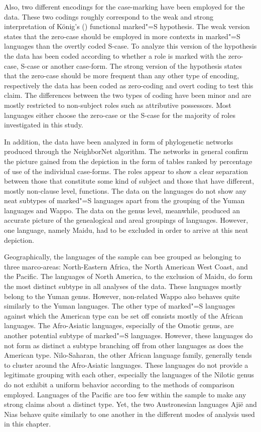 Also, two different encodings for the case-marking have been employed for the data. 
These two codings roughly correspond to the weak and strong interpretation of K\"onig's (\citeyear{Koenig:2006}) functional marked"=S hypothesis. 
The weak version states that the zero-case should be employed in more contexts in marked"=S languages than the overtly coded S-case. 
To analyze this version of the hypothesis the data has been coded according to whether a role is marked with the zero-case, S-case or another case-form. 
The strong version of the hypothesis states that the zero-case should be more frequent than any other type of encoding, respectively the data has been coded as zero-coding and overt coding to test this claim.
The differences between the two types of coding have been minor and are mostly restricted to non-subject roles such as attributive possessors.
Most languages either choose the zero-case or the S-case for the majority of roles investigated in this study.

In addition, the data have been analyzed in form of phylogenetic networks produced through the NeighborNet algorithm. 
The networks in general confirm the picture gained from the depiction in the form of tables ranked by percentage of use of the individual case-forms.
The roles appear to show a clear separation between those that constitute some kind of subject and those that have different, mostly non-clause level, functions. 
The data on the languages do not show any neat subtypes of marked"=S languages apart from the grouping of the Yuman languages and Wappo.
The data on the genus level, meanwhile, produced an accurate picture of the genealogical and areal groupings of languages. 
However, one language, namely Maidu, had to be excluded in order to arrive at this neat depiction. 

Geographically, the languages of the sample can bee grouped as belonging to three marco-areas: North-Eastern Africa, the North American West Coast, and the Pacific. 
The languages of North America, to the exclusion of Maidu, do form the most distinct subtype in all analyses of the data. These languages mostly belong to the Yuman genus. 
However, non-related Wappo also behaves quite similarly to the Yuman languages. The other type of marked"=S languages against which the American type can be set off consists mostly of the African languages. 
The Afro-Asiatic languages, especially of the Omotic genus, are another potential subtype of marked"=S languages. 
However, these languages do not form as distinct a subtype branching off from other languages as does the American type. 
Nilo-Saharan, the other African language family, generally tends to cluster around the Afro-Asiatic languages. 
These languages do not provide a legitimate grouping with each other, especially the languages of the Nilotic genus do not exhibit a uniform behavior according to the methods of comparison employed. 
Languages of the Pacific are too few within the sample to make any strong claims about a distinct type. 
Yet, the two Austronesian languages Aji\"e and Nias behave quite similarly to one another in the different modes of analysis used in this chapter.  

